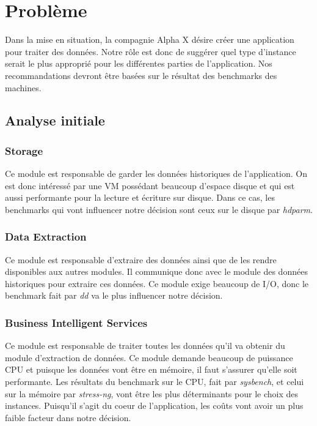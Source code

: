  \chapter{Problème}

Dans la mise en situation, la compagnie Alpha X désire créer une application pour traiter des données. Notre rôle est donc de suggérer quel type d'instance serait le plus approprié pour les différentes parties de l'application. Nos recommandations devront être basées sur le résultat des benchmarks des machines.

\section{Analyse initiale}
 
\subsection{Storage}

Ce module est responsable de garder les données historiques de l'application. On est donc intéressé par une VM possédant beaucoup d'espace disque et qui est aussi performante pour la lecture et écriture sur disque. Dans ce cas, les benchmarks qui vont influencer notre décision sont ceux sur le disque par \textit{hdparm}.
 
\subsection{Data Extraction}

Ce module est responsable d'extraire des données ainsi que de les rendre disponibles aux autres modules. Il communique donc avec le module des données historiques pour extraire ces données. Ce module exige beaucoup de I/O, donc le benchmark fait par \textit{dd} va le plus influencer notre décision.


\subsection{Business Intelligent Services}

Ce module est responsable de traiter toutes les données qu'il va obtenir du module d'extraction de données. Ce module demande beaucoup de puissance CPU et puisque les données vont être en mémoire, il faut s'assurer qu'elle soit performante. Les résultats du benchmark sur le CPU, fait par \textit{sysbench}, et celui sur la mémoire par \textit{stress-ng}, vont être les plus déterminants pour le choix des instances. Puisqu'il s'agit du coeur de l'application, les coûts vont avoir un plus faible facteur dans notre décision.


